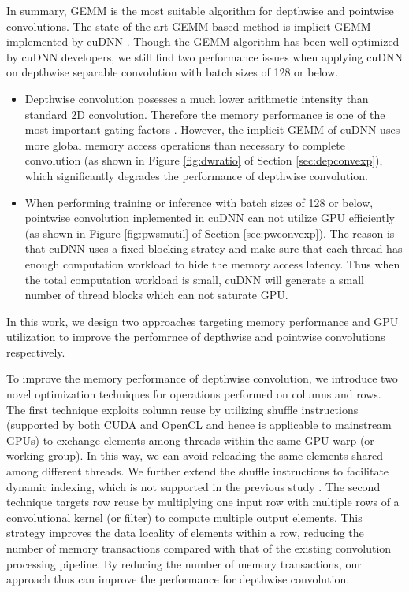 In summary, GEMM is the most suitable algorithm for depthwise and pointwise convolutions.
The state-of-the-art GEMM-based method is implicit GEMM implemented by cuDNN \cite{ChetlurWVCTCS14}.
Though the GEMM algorithm has been well optimized by cuDNN developers, we still find two performance issues when applying cuDNN on depthwise separable convolution with batch sizes of 128 or below.
\begin{itemize}
    \item Depthwise convolution posesses a much lower arithmetic intensity than standard 2D convolution. Therefore the memory performance is one of the most important gating factors \cite{cudaperformance}. 
    However, the implicit GEMM of cuDNN uses more global memory access operations than necessary to complete convolution (as shown in Figure \ref{fig:dwratio} of Section \ref{sec:depconvexp}), which significantly degrades the performance of depthwise convolution.
    \item When performing training or inference with batch sizes of 128 or below, pointwise convolution inplemented in cuDNN can not utilize GPU efficiently (as shown in Figure \ref{fig:pwsmutil} of Section \ref{sec:pwconvexp}).
    The reason is that cuDNN uses a fixed blocking stratey and make sure that each thread has enough computation workload to hide the memory access latency. 
    Thus when the total computation workload is small, cuDNN will generate a small number of thread blocks which can not saturate GPU. 
\end{itemize}
In this work, we design two approaches targeting memory performance and GPU utilization to improve the perfomrnce of depthwise and pointwise convolutions respectively. 

To improve the memory performance of depthwise convolution, we introduce two novel optimization techniques for operations performed on columns and rows. 
The first technique exploits column reuse by utilizing shuffle instructions (supported by both CUDA and OpenCL and hence is applicable to mainstream GPUs) to exchange elements among threads within the same GPU warp (or working group). 
In this way, we can avoid reloading the same elements shared among different threads. 
We further extend the shuffle instructions to facilitate dynamic indexing, which is not supported in the previous study \cite{vasilache2014fast}. 
The second technique targets row reuse by multiplying one input row with multiple rows of a convolutional kernel (or filter) to compute multiple output elements. 
This strategy improves the data locality of elements within a row, reducing the number of memory transactions compared with that of the
existing convolution processing pipeline. 
By reducing the number of memory transactions, our approach thus can improve the performance for depthwise convolution.

